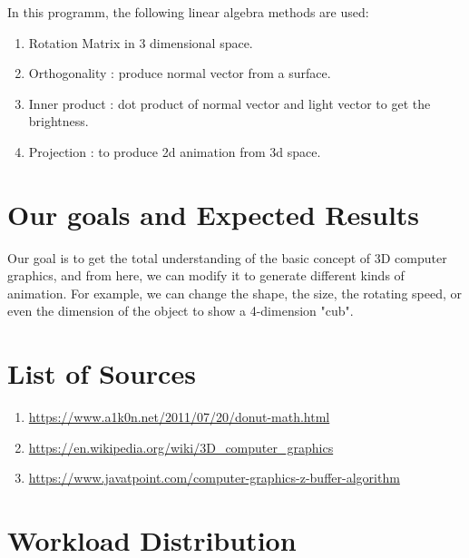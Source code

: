 \documentclass{article}
\begin{document}
In this programm, the following linear algebra methods are used:
\begin{enumerate}
  \item Rotation Matrix in 3 dimensional space.
  \item Orthogonality : produce normal vector from a surface.
  \item Inner product : dot product of normal vector and light vector to get the brightness.
  \item Projection : to produce 2d animation from 3d space.
\end{enumerate}

\section{Our goals and Expected Results}
Our goal is to get the total understanding of the basic concept of 3D computer graphics, and from here, we can modify it to generate different kinds of animation. 
For example, we can change the shape, the size, the rotating speed, or even the dimension of the object to show a 4-dimension "cub".
\section{List of Sources}
\begin{enumerate}
  \item \url{https://www.a1k0n.net/2011/07/20/donut-math.html}
  \item \url{https://en.wikipedia.org/wiki/3D_computer_graphics}
  \item \url{https://www.javatpoint.com/computer-graphics-z-buffer-algorithm}
\end{enumerate}
\section{Workload Distribution}
\end{document}
